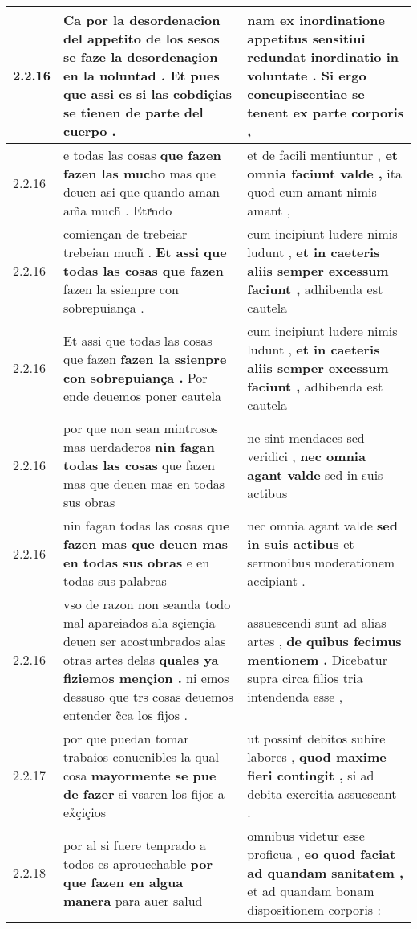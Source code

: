 \begin{tabular}{|p{1cm}|p{6.5cm}|p{6.5cm}|}
2.2.16 & Ca por la desordenacion del appetito de los sesos \textbf{ se faze la desordenaçion en la uoluntad . } Et pues que assi es si las cobdiçias se tienen de parte del cuerpo . & nam ex inordinatione appetitus sensitiui \textbf{ redundat inordinatio in voluntate . } Si ergo concupiscentiae se tenent ex parte corporis , \\\hline
2.2.16 & e todas las cosas \textbf{ que fazen fazen las mucho } mas que deuen asi que quando aman am̃a much̃ . Etrͣndo & et de facili mentiuntur , \textbf{ et omnia faciunt valde , } ita quod cum amant nimis amant , \\\hline
2.2.16 & comiençan de trebeiar trebeian much̃ . \textbf{ Et assi que todas las cosas que fazen } fazen la ssienpre con sobrepuiança . & cum incipiunt ludere nimis ludunt , \textbf{ et in caeteris aliis semper excessum faciunt , } adhibenda est cautela \\\hline
2.2.16 & Et assi que todas las cosas que fazen \textbf{ fazen la ssienpre con sobrepuiança . } Por ende deuemos poner cautela & cum incipiunt ludere nimis ludunt , \textbf{ et in caeteris aliis semper excessum faciunt , } adhibenda est cautela \\\hline
2.2.16 & por que non sean mintrosos mas uerdaderos \textbf{ nin fagan todas las cosas } que fazen mas que deuen mas en todas sus obras & ne sint mendaces sed veridici , \textbf{ nec omnia agant valde } sed in suis actibus \\\hline
2.2.16 & nin fagan todas las cosas \textbf{ que fazen mas que deuen mas en todas sus obras } e en todas sus palabras & nec omnia agant valde \textbf{ sed in suis actibus } et sermonibus moderationem accipiant . \\\hline
2.2.16 & vso de razon non seanda todo mal apareiados ala sçiençia deuen ser acostunbrados alas otras artes delas \textbf{ quales ya fiziemos mençion . } ni emos dessuso que trs cosas deuemos entender c̃ca los fijos . & assuescendi sunt ad alias artes , \textbf{ de quibus fecimus mentionem . } Dicebatur supra circa filios tria intendenda esse , \\\hline
2.2.17 & por que puedan tomar trabaios conuenibles la qual cosa \textbf{ mayormente se pue de fazer } si vsaren los fijos a ex̉çiçios & ut possint debitos subire labores , \textbf{ quod maxime fieri contingit , } si ad debita exercitia assuescant . \\\hline
2.2.18 & por al si fuere tenprado a todos es aprouechable \textbf{ por que fazen en algua manera } para auer salud & omnibus videtur esse proficua , \textbf{ eo quod faciat ad quandam sanitatem , } et ad quandam bonam dispositionem corporis : \\\hline

\end{tabular}
